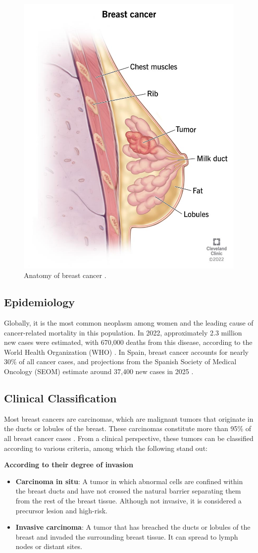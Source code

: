 \documentclass[a4paper,10pt]{book}
\begin{document}
\begin{figure}[h]
	\centering
	\includegraphics[width=0.3\linewidth]{reports//assets/bc.jpg}
	\caption[Anatomy of breast cancer]{Anatomy of breast cancer \cite{cleveland_clinic_breast_2023}.}
	\label{fig:breast-cancer-anatomy}
\end{figure}

\subsection{Epidemiology}

Globally, it is the most common neoplasm among women and the leading cause of cancer-related mortality in this population. In 2022, approximately 2.3 million new cases were estimated, with 670,000 deaths from this disease, according to the World Health Organization (WHO) \cite{who_breast_2024}. In Spain, breast cancer accounts for nearly 30\% of all cancer cases, and projections from the Spanish Society of Medical Oncology (SEOM) estimate around 37,400 new cases in 2025 \cite{seom_cancer_nodate}.

\subsection{Clinical Classification}

Most breast cancers are carcinomas, which are malignant tumors that originate in the ducts or lobules of the breast. These carcinomas constitute more than 95\% of all breast cancer cases \cite{makki_diversity_2015, noauthor_types_nodate}. From a clinical perspective, these tumors can be classified according to various criteria, among which the following stand out:

\textbf{According to their degree of invasion}
\begin{itemize}
	\item \textbf{Carcinoma in situ}: A tumor in which abnormal cells are confined within the breast ducts and have not crossed the natural barrier separating them from the rest of the breast tissue. Although not invasive, it is considered a precursor lesion and high-risk.
	\item \textbf{Invasive carcinoma}: A tumor that has breached the ducts or lobules of the breast and invaded the surrounding breast tissue. It can spread to lymph nodes or distant sites. 
\end{itemize}
\end{document}
